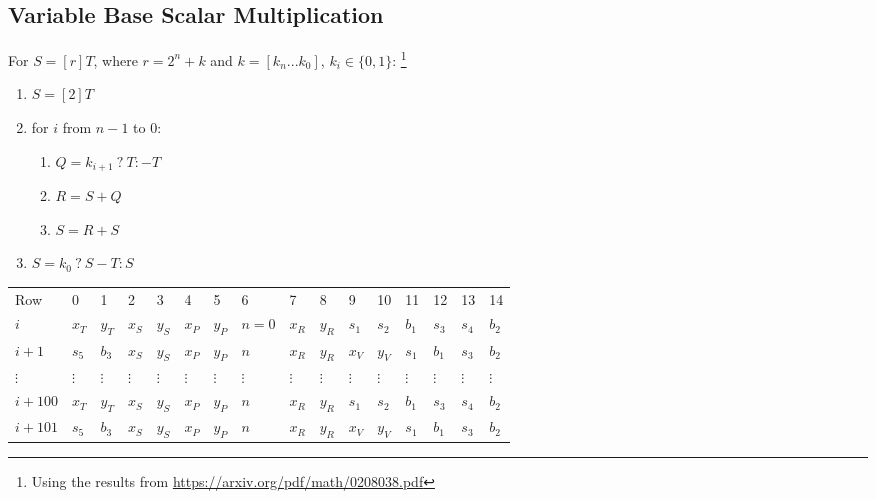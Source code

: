 \subsection{Variable Base Scalar Multiplication}
For $S  = [r]T$, where $r = 2^n + k$ and $k = [k_n ... k_0]$, $k_i \in \{0, 1\}$:
\footnote{Using the results from \url{https://arxiv.org/pdf/math/0208038.pdf}}
\begin{enumerate}
    \item $S = [2]T$
    \item for $i$ from $n - 1$ to $0$:
    \begin{enumerate}
        \item $Q = k_{i + 1} \: ? \: T : -T$
        \item $R = S + Q$
        \item $S = R + S$
    \end{enumerate}
    \item $S = k_0 \: ? \: S - T : S$
\end{enumerate}

\begin{center}
    \begin{table}[H]
        \begin{tabular}{llllllllllllllll}
            Row     & 0        & 1        & 2        & 3        & 4        & 5        & 6        & 7        & 8        & 9        & 10       & 11       & 12       & 13       & 14       \\
            $i$    & $x_T$    & $y_T$    & $x_S$    & $y_S$    & $x_P$    & $y_P$    & $n=0$    & $x_R$    & $y_R$    & $s_1$    & $s_2$    & $b_1$    & $s_3$ & $s_4$ & $b_2$ \\
            $i + 1$   & $s_5$    & $b_3$    & $x_S$    & $y_S$    & $x_P$    & $y_P$    & $n$      & $x_R$    & $y_R$    & $x_V$    & $y_V$    & $s_1$    & $b_1$ & $s_3$ & $b_2$ \\
            $\vdots$  & $\vdots$ & $\vdots$ & $\vdots$ & $\vdots$ & $\vdots$ & $\vdots$ & $\vdots$ & $\vdots$ & $\vdots$ & $\vdots$ & $\vdots$ & $\vdots$ & $\vdots$ & $\vdots$ & $\vdots$ \\
            $i + 100$ & $x_T$    & $y_T$    & $x_S$    & $y_S$    & $x_P$    & $y_P$    & $n$      & $x_R$    & $y_R$    & $s_1$    & $s_2$    & $b_1$ & $s_3$ & $s_4$ & $b_2$ \\
            $i + 101$ & $s_5$    & $b_3$    & $x_S$    & $y_S$    & $x_P$    & $y_P$    & $n$      & $x_R$    & $y_R$    & $x_V$    & $y_V$    & $s_1$ & $b_1$ & $s_3$ & $b_2$ \\
        \end{tabular}
    \end{table}
\end{center}

